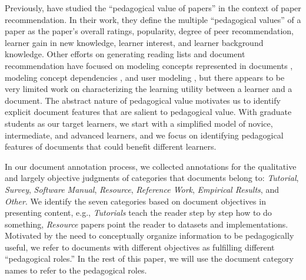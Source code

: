 \documentclass[11pt,a4paper]{article}
\begin{document}
Previously, \citet{tang2009pedagogical} have studied the ``pedagogical value of papers'' in the context of paper recommendation. In their work, they define the multiple ``pedagogical values'' of a paper as the paper's overall ratings, popularity, degree of peer recommendation, learner gain in new knowledge, learner interest, and learner background knowledge. Other efforts on generating reading lists and document recommendation have focused on modeling concepts represented in documents \cite{jardine2014automatically}, modeling concept dependencies \cite{gordon16}, and user modeling \cite{Bollacker:1999:SAP:313238.313270}, but there appears to be very limited work on characterizing the learning utility between a learner and a document. The abstract nature of pedagogical value motivates us to identify explicit document features that are salient to pedagogical value. With graduate students as our target learners, we start with a simplified model of novice, intermediate, and advanced learners, and we focus on identifying pedagogical features of documents that could benefit different learners.
%
%
%

In our document annotation process, we collected annotations for the qualitative and largely objective judgments of categories that documents belong to: \textit{Tutorial}, \textit{Survey}, \textit{Software Manual}, \textit{Resource}, \textit{Reference Work}, \textit{Empirical Results}, and \textit{Other}. We identify the seven categories based on document objectives in presenting content, e.g., \textit{Tutorials} teach the reader step by step how to do something, \textit{Resource} papers point the reader to datasets and implementations. Motivated by the need to conceptually organize information to be pedagogically useful, we refer to documents with different objectives as fulfilling different ``pedagogical roles.'' In the rest of this paper, we will use the document category names to refer to the pedagogical roles.
%
%
\end{document}
